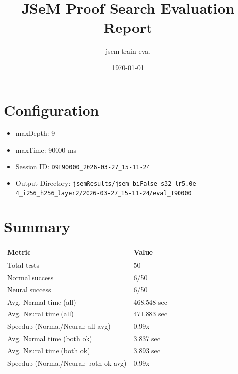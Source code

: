 \documentclass[a4paper,10pt]{article}
\title{JSeM Proof Search Evaluation Report}
\author{jsem-train-eval}
\date{\today}
\begin{document}
\maketitle

\section{Configuration}
\begin{itemize}
\item maxDepth: 9
\item maxTime: 90000 ms
\item Session ID: \texttt{D9T90000\_2026-03-27\_15-11-24}
\item Output Directory: \texttt{jsemResults/jsem\_biFalse\_s32\_lr5.0e-4\_i256\_h256\_layer2/2026-03-27\_15-11-24/eval\_T90000}
\end{itemize}

\section{Summary}
\begin{tabular}{ll}
\toprule
\textbf{Metric} & \textbf{Value} \\
\midrule
Total tests & 50 \\
Normal success & 6/50 \\
Neural success & 6/50 \\
\midrule
Avg. Normal time (all) & 468.548 sec \\
Avg. Neural time (all) & 471.883 sec \\
Speedup (Normal/Neural; all avg) & 0.99x \\
Avg. Normal time (both ok) & 3.837 sec \\
Avg. Neural time (both ok) & 3.893 sec \\
Speedup (Normal/Neural; both ok avg) & 0.99x \\
\bottomrule
\end{tabular}
\end{document}
